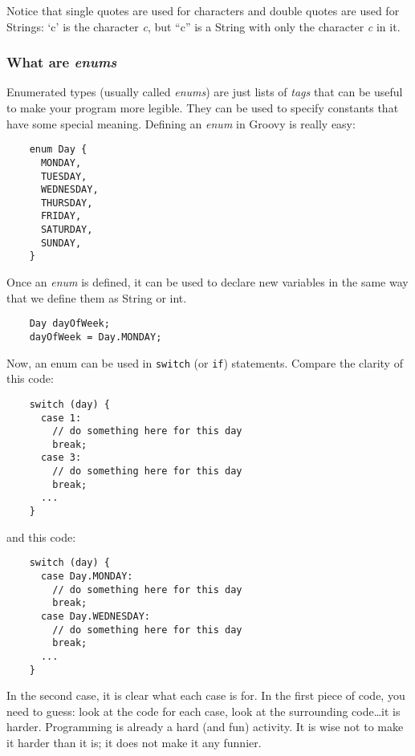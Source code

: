 Notice that single quotes are used for characters and double quotes
are used for Strings: `c' is the character \emph{c}, but ``c'' is a
String with only the character \emph{c} in it. 

\subsubsection{What are \emph{enums}}
\label{sec:what-types-enum}

Enumerated types (usually called \emph{enums}) 
are just lists of \emph{tags} that can be useful to
make your program more legible. They can be used to specify constants
that have some special meaning. Defining an \emph{enum} in Groovy is
really easy: 

\begin{verbatim}
    enum Day {
      MONDAY,
      TUESDAY,
      WEDNESDAY,
      THURSDAY,
      FRIDAY,
      SATURDAY,
      SUNDAY,
    }
\end{verbatim}

Once an \emph{enum} is defined, it can be used to declare new variables in
the same way that we define them as String or int. 

\begin{verbatim}
    Day dayOfWeek;
    dayOfWeek = Day.MONDAY;
\end{verbatim}

Now, an enum can be used in \texttt{switch} (or \texttt{if})
statements. Compare the clarity of this code:

\begin{verbatim}
    switch (day) {
      case 1: 
        // do something here for this day
        break;
      case 3: 
        // do something here for this day
        break;
      ...
    }
\end{verbatim}

and this code:

\begin{verbatim}
    switch (day) {
      case Day.MONDAY: 
        // do something here for this day
        break;
      case Day.WEDNESDAY: 
        // do something here for this day
        break;
      ...
    }
\end{verbatim}

In the second case, it is clear what each case is for. In the first
piece of code, you need to guess: look at the code for each case, look
at the surrounding code\ldots it is harder. Programming is already a
hard (and fun) activity. It is wise not to make it harder than it is;
it does not make it any funnier. 

